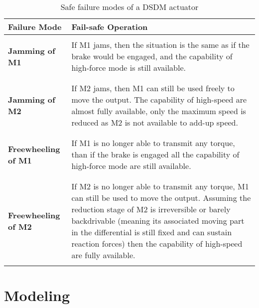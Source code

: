 \begin{table}[h]
	\centering
	\caption{Safe failure modes of a DSDM actuator}
	\vspace{+5pt}
		\begin{tabular}{| p{1.8in} | p{4.2in} |}
		\hline \hline
		\textbf{Failure Mode} & \textbf{Fail-safe Operation} \\	\hline \hline & \\
		\textbf{Jamming of M1} &
				If M1 jams, then the situation is the same as if the brake would be engaged, and the capability of high-force mode is still available. \\  & \\ \hline & \\
				\textbf{Jamming of M2} &
				If M2 jams, then M1 can still be used freely to move the output. The capability of high-speed are almost fully available, only the maximum speed is reduced as M2 is not available to add-up speed. \\ & \\ \hline & \\  
				\textbf{Freewheeling of M1} & 
				If M1 is no longer able to transmit any torque, than if the brake is engaged all the capability of high-force mode are still available. \\ & \\ \hline & \\
				\textbf{Freewheeling of M2} & 
				If M2 is no longer able to transmit any torque, M1 can still be used to move the output. Assuming the reduction stage of M2 is irreversible or barely backdrivable (meaning its associated moving part in the differential is still fixed and can sustain reaction forces) then the capability of high-speed are fully available.			\\	& \\ \hline \hline
		\end{tabular}
	\label{tab:FailureModesOfADSDMActuator}
\end{table}



\newpage

\section{Modeling}
\label{sec:mod}

